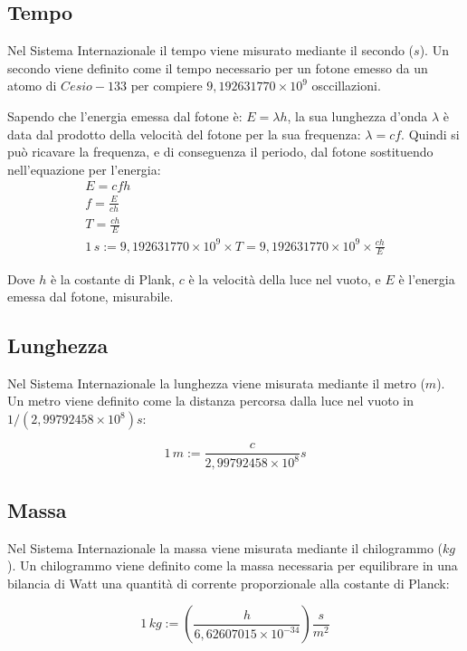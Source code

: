 \documentclass{article}
\numberwithin{equation}{subsection}
\begin{document}
\subsection{Tempo}

Nel Sistema Internazionale il tempo viene misurato mediante 
il secondo ($s$).
Un secondo viene definito come il tempo necessario per un 
fotone emesso da un atomo di $Cesio-133$ per compiere 
$9{,}192631770\times 10^9$ osccillazioni.



Sapendo che l'energia emessa dal fotone è: 
$E= \lambda h$, la sua lunghezza 
d'onda $\lambda$ è data dal prodotto della velocità del fotone 
per la sua frequenza: $\lambda  = cf$.
Quindi si può ricavare la frequenza, e di conseguenza il 
periodo, dal fotone sostituendo nell'equazione per l'energia: 
\begin{gather*}
    E = cfh\\
    f = \displaystyle\frac{E}{ch}\\
    T = \displaystyle\frac{ch}{E}\\
    1\,s := 9{,}192631770\times 10^9 \times T = 9{,}192631770\times 10^9 \times \displaystyle\frac{ch}{E}
\end{gather*}

Dove $h$ è la costante di Plank, $c$ è la velocità della luce nel vuoto, e $E$ è l'energia emessa dal fotone, misurabile.

\subsection{Lunghezza}
Nel Sistema Internazionale la lunghezza viene misurata 
mediante il metro ($m$). Un metro viene definito come la 
distanza percorsa dalla luce nel vuoto in 
$1/(2{,}99792458\times 10^8)s$:

\begin{equation*}
    1\,m := \displaystyle\frac{c}{2{,}99792458\times 10^8}s
\end{equation*}

\subsection{Massa}
Nel Sistema Internazionale la massa viene misurata mediante 
il chilogrammo ($kg$). Un chilogrammo viene definito come la 
massa necessaria per equilibrare in una bilancia di Watt una 
quantità di corrente proporzionale alla costante di Planck:

\begin{equation*}
    1\,kg := \left(\displaystyle\frac{ h}{ 6{,}62607015 \times 10^{-34}}\right)\frac{\displaystyle s}{\displaystyle m^{2}}
\end{equation*}
\end{document}
